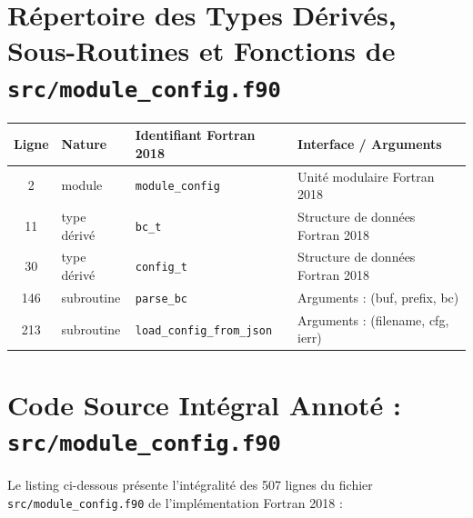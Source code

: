\documentclass[10pt,a4paper,oneside]{book}
\begin{document}
\section{Répertoire des Types Dérivés, Sous-Routines et Fonctions de \texttt{src/module\_config.f90}}
\begin{center}\small
\begin{tabular}{clll}
\toprule
\textbf{Ligne} & \textbf{Nature} & \textbf{Identifiant Fortran 2018} & \textbf{Interface / Arguments} \\
\midrule
2 & module & \texttt{module\_config} & Unité modulaire Fortran 2018 \\
11 & type dérivé & \texttt{bc\_t} & Structure de données Fortran 2018 \\
30 & type dérivé & \texttt{config\_t} & Structure de données Fortran 2018 \\
146 & subroutine & \texttt{parse\_bc} & Arguments : (buf, prefix, bc) \\
213 & subroutine & \texttt{load\_config\_from\_json} & Arguments : (filename, cfg, ierr) \\
\bottomrule
\end{tabular}
\end{center}

\section{Code Source Intégral Annoté : \texttt{src/module\_config.f90}}
Le listing ci-dessous présente l'intégralité des 507 lignes du fichier \texttt{src/module\_config.f90} de l'implémentation Fortran 2018 :
\end{document}

